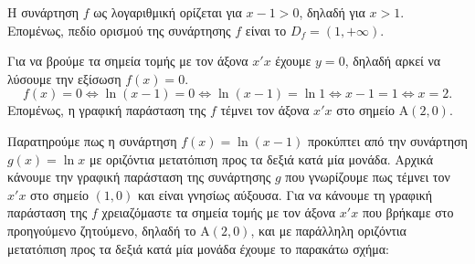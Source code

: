 \begin{alist}
\item Η συνάρτηση $f$ ως λογαριθμική ορίζεται για $x - 1 > 0$, δηλαδή για $x > 1$. \\
Επομένως, πεδίο ορισμού της συνάρτησης $f$ είναι το $D_f = (1, +\infty)$.
\item Για να βρούμε τα σημεία τομής με τον άξονα $x'x$ έχουμε $y = 0$, δηλαδή αρκεί να λύσουμε την εξίσωση $f(x) = 0$.
\[f(x) = 0 \Leftrightarrow \ln(x - 1) = 0 \Leftrightarrow \ln(x - 1) = \ln 1 \Leftrightarrow x - 1 = 1 \Leftrightarrow x = 2.\]
Επομένως, η γραφική παράσταση της $f$ τέμνει τον άξονα $x'x$ στο σημείο $\text{A}(2, 0)$.
\item Παρατηρούμε πως η συνάρτηση $f(x) = \ln(x - 1)$ προκύπτει από την συνάρτηση $g(x) = \ln x$ με οριζόντια μετατόπιση προς τα δεξιά κατά μία μονάδα. Αρχικά κάνουμε την γραφική παράσταση της συνάρτησης $g$ που γνωρίζουμε πως τέμνει τον $x'x$ στο σημείο $(1, 0)$ και είναι γνησίως αύξουσα. Για να κάνουμε τη γραφική παράσταση της $f$ χρειαζόμαστε τα σημεία τομής με τον άξονα $x'x$ που βρήκαμε στο προηγούμενο ζητούμενο, δηλαδή το $\text{A}(2, 0)$, και με παράλληλη οριζόντια μετατόπιση προς τα δεξιά κατά μία μονάδα έχουμε το παρακάτω σχήμα:
\begin{center}
\end{center}
\vspace{-5mm}
\end{alist}

